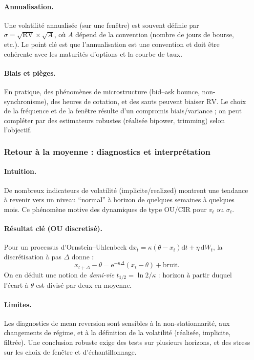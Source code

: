 \documentclass[11pt,a4paper]{article}
\newcommand{\dd}{\mathrm{d}}
\newcommand{\ee}{\mathrm{e}}
\newcommand{\1}{\mathbf{1}}
\begin{document}
\paragraph{Annualisation.}
Une volatilité annualis\'ee (sur une fen\^etre) est souvent d\'efinie par $\widehat\sigma=\sqrt{\mathrm{RV}}\times\sqrt{A}$,
o\`u $A$ d\'epend de la convention (nombre de jours de bourse, etc.). Le point cl\'e est que l'annualisation est une convention
et doit \^etre coh\'erente avec les maturit\'es d'options et la courbe de taux.

\paragraph{Biais et pi\`eges.}
En pratique, des ph\'enom\`enes de microstructure (bid--ask bounce, non-synchronisme), des heures de cotation, et des sauts
peuvent biaiser $\mathrm{RV}$. Le choix de la fr\'equence et de la fen\^etre r\'esulte d'un compromis biais/variance ; on peut
compl\'eter par des estimateurs robustes (r\'ealis\'ee bipower, trimming) selon l'objectif.

\subsubsection{Retour \`a la moyenne : diagnostics et interpr\'etation}

\paragraph{Intuition.}
De nombreux indicateurs de volatilité (implicite/realized) montrent une tendance \`a revenir vers un niveau ``normal'' \`a horizon
de quelques semaines \`a quelques mois. Ce ph\'enom\`ene motive des dynamiques de type OU/CIR pour $v_t$ ou $\sigma_t$.

\paragraph{R\'esultat cl\'e (OU discretis\'e).}
Pour un processus d'Ornstein--Uhlenbeck $\dd x_t=\kappa(\theta-x_t)\dd t + \eta\,\dd W_t$, la discr\'etisation \`a pas $\Delta$ donne :
\[
x_{t+\Delta}-\theta = \ee^{-\kappa\Delta}(x_t-\theta) + \text{bruit}.
\]
On en d\'eduit une notion de \emph{demi-vie} $t_{1/2}=\ln 2/\kappa$ : horizon \`a partir duquel l'\'ecart \`a $\theta$ est divis\'e par deux en moyenne.

\paragraph{Limites.}
Les diagnostics de mean reversion sont sensibles \`a la non-stationnarit\'e, aux changements de r\'egime, et \`a la d\'efinition
de la volatilité (r\'ealis\'ee, implicite, filtr\'ee). Une conclusion robuste exige des tests sur plusieurs horizons, et des stress
sur les choix de fen\^etre et d'\'echantillonnage.
\end{document}
